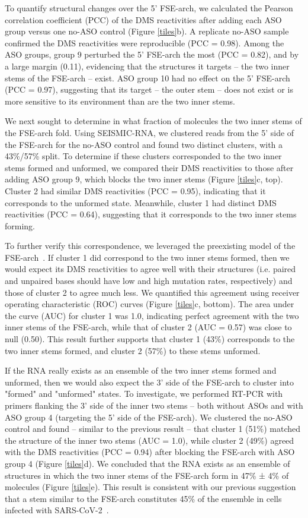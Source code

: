 \documentclass[main.tex]{subfiles}
\begin{document}
To quantify structural changes over the 5' FSE-arch, we calculated the Pearson correlation coefficient (PCC) of the DMS reactivities after adding each ASO group versus one no-ASO control (Figure \ref{tiles}b).
A replicate no-ASO sample confirmed the DMS reactivities were reproducible (PCC = 0.98).
Among the ASO groups, group 9 perturbed the 5' FSE-arch the most (PCC = 0.82), and by a large margin (0.11), evidencing that the structures it targets -- the two inner stems of the FSE-arch -- exist.
ASO group 10 had no effect on the 5' FSE-arch (PCC = 0.97), suggesting that its target -- the outer stem -- does not exist or is more sensitive to its environment than are the two inner stems.

We next sought to determine in what fraction of molecules the two inner stems of the FSE-arch fold.
Using SEISMIC-RNA, we clustered reads from the 5' side of the FSE-arch for the no-ASO control and found two distinct clusters, with a 43\%/57\% split.
To determine if these clusters corresponded to the two inner stems formed and unformed, we compared their DMS reactivities to those after adding ASO group 9, which blocks the two inner stems (Figure \ref{tiles}c, top).
Cluster 2 had similar DMS reactivities (PCC = 0.95), indicating that it corresponds to the unformed state.
Meanwhile, cluster 1 had distinct DMS reactivities (PCC = 0.64), suggesting that it corresponds to the two inner stems forming.

To further verify this correspondence, we leveraged the preexisting model of the FSE-arch~\cite{Ziv2020}.
If cluster 1 did correspond to the two inner stems formed, then we would expect its DMS reactivities to agree well with their structures (i.e. paired and unpaired bases should have low and high mutation rates, respectively) and those of cluster 2 to agree much less.
We quantified this agreement using receiver operating characteristic (ROC) curves (Figure \ref{tiles}c, bottom).
The area under the curve (AUC) for cluster 1 was 1.0, indicating perfect agreement with the two inner stems of the FSE-arch, while that of cluster 2 (AUC = 0.57) was close to null (0.50).
This result further supports that cluster 1 (43\%) corresponds to the two inner stems formed, and cluster 2 (57\%) to these stems unformed.

If the RNA really exists as an ensemble of the two inner stems formed and unformed, then we would also expect the 3' side of the FSE-arch to cluster into "formed" and "unformed" states.
To investigate, we performed RT-PCR with primers flanking the 3' side of the inner two stems -- both without ASOs and with ASO group 4 (targeting the 5' side of the FSE-arch).
We clustered the no-ASO control and found -- similar to the previous result -- that cluster 1 (51\%) matched the structure of the inner two stems (AUC = 1.0), while cluster 2 (49\%) agreed with the DMS reactivities (PCC = 0.94) after blocking the FSE-arch with ASO group 4 (Figure \ref{tiles}d).
We concluded that the RNA exists as an ensemble of structures in which the two inner stems of the FSE-arch form in 47\% ± 4\% of molecules (Figure \ref{tiles}e).
This result is consistent with our previous suggestion that a stem similar to the FSE-arch constitutes 45\% of the ensemble in cells infected with SARS-CoV-2~\cite{Lan2022}.
\end{document}
